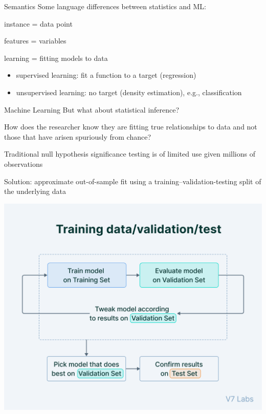 \documentclass{./../div_teaching_slides}
\begin{document}
\begin{frame}{Semantics}
Some language differences between statistics and ML:\\
\begin{witemize}
\item instance = data point
\item features = variables
\item learning = fitting models to data \\
\begin{itemize}
\normalsize
\item supervised learning: fit a function to a target (regression)
\item unsupervised learning: no target (density estimation), e.g., classification  
\end{itemize}
\end{witemize}
\end{frame}

\begin{frame}{Machine Learning}
But what about statistical inference? \\
\begin{witemize}
  \item How does the researcher know they are fitting true relationships to data and not those that have arisen spuriously from chance?
  \item Traditional null hypothesis significance testing is of limited use given millions of observations
  \item Solution: approximate out-of-sample fit using a training–validation-testing split of the underlying data
\end{witemize}
\end{frame}

\begin{frame}{}
\centering
\includegraphics[scale=0.55]{61568656a13218cdde7f6166_training-data-validation-test.png}
\end{frame}
\end{document}
